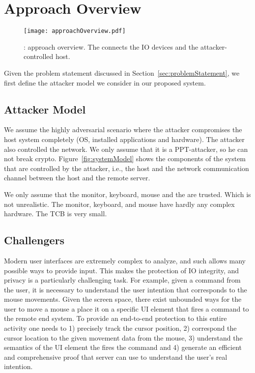 \section{Approach Overview}
\label{sec:approach}



\begin{figure}[t]
\centering
\texttt{[image: approachOverview.pdf]}
\caption{\name: approach overview.  The \device connects the IO devices and the attacker-controlled host.}
\label{fig:approachOverview}
\centering
\end{figure}

Given the problem statement discussed in Section~\ref{sec:problemStatement}, we first define the attacker model we consider in our proposed system.


\subsection{Attacker Model}

We assume the highly adversarial scenario where the attacker compromises the host system completely (OS, installed applications and hardware). The attacker also controlled the network. We only assume that it is a PPT-attacker, so he can not break crypto. Figure~\ref{fig:systemModel} shows the components of the system that are controlled by the attacker, i.e., the host and the network communication channel between the host and the remote server.

We only assume that the monitor, keyboard, mouse and the \device are trusted. Which is not unrealistic. The monitor, keyboard, and mouse have hardly any complex hardware. The TCB is very small.

\subsection{Challengers}

Modern user interfaces are extremely complex to analyze, and such allows many possible ways to provide input. This makes the protection of IO integrity, and privacy is a particularly challenging task. For example, given a command from the user, it is necessary to understand the user intention that corresponds to the mouse movements. Given the screen space, there exist unbounded ways for the user to move a mouse a place it on a specific UI element that fires a command to the remote end system. To provide an end-to-end protection to this entire activity one needs to 1) precisely track the cursor position, 2) correspond the cursor location to the given movement data from the mouse, 3) understand the semantics of the UI element the fires the command and 4) generate an efficient and comprehensive proof that server can use to understand the user's real intention.  



